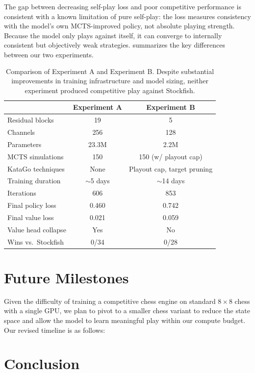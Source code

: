 \documentclass{article}
\begin{document}
The gap between decreasing self-play loss and poor competitive performance is consistent with a known limitation of pure self-play: the loss measures consistency with the model's own MCTS-improved policy, not absolute playing strength. Because the model only plays against itself, it can converge to internally consistent but objectively weak strategies.  summarizes the key differences between our two experiments.

\begin{table}[h]
\centering
\caption{Comparison of Experiment A and Experiment B. Despite substantial improvements in training infrastructure and model sizing, neither experiment produced competitive play against Stockfish.}
\label{tab:comparison}
\begin{tabular}{@{}lcc@{}}
\toprule
 & Experiment A & Experiment B \\
\midrule
Residual blocks & 19 & 5 \\
Channels & 256 & 128 \\
Parameters & 23.3M & 2.2M \\
MCTS simulations & 150 & 150 (w/ playout cap) \\
KataGo techniques & None & Playout cap, target pruning \\
Training duration & $\sim$5 days & $\sim$14 days \\
Iterations & 606 & 853 \\
Final policy loss & 0.460 & 0.742 \\
Final value loss & 0.021 & 0.059 \\
Value head collapse & Yes & No \\
Wins vs.\ Stockfish & 0/34 & 0/28 \\
\bottomrule
\end{tabular}
\end{table}

\section{Future Milestones}
\label{sec:milestones}

Given the difficulty of training a competitive chess engine on standard $8 \times 8$ chess with a single GPU, we plan to pivot to a smaller chess variant to reduce the state space and allow the model to learn meaningful play within our compute budget. Our revised timeline is as follows:



\section{Conclusion}
\label{sec:conclusion}





\end{document}
